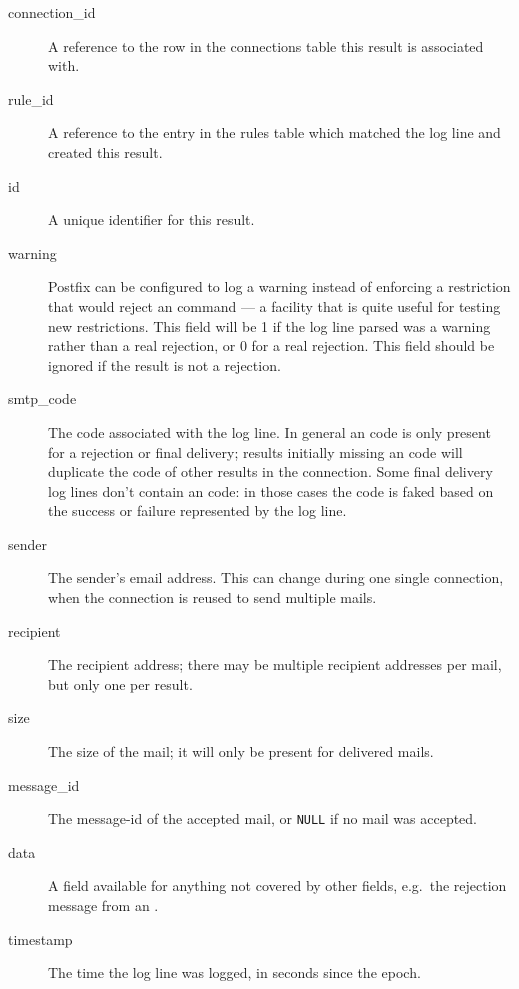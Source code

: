 \documentclass[a4paper,12pt,draft]{article}
\begin{document}
\begin{description}

    \item [connection\_id] A reference to the row in the connections table
        this result is associated with.

    \item [rule\_id] A reference to the entry in the rules table which
        matched the log line and created this result.

    \item [id] A unique identifier for this result.

    \item [warning] Postfix can be configured to log a warning instead of
        enforcing a restriction that would reject an \SMTP{} command --- a
        facility that is quite useful for testing new restrictions.  This
        field will be 1 if the log line parsed was a warning rather than a
        real rejection, or 0 for a real rejection.  This field should be
        ignored if the result is not a rejection.

    \item [smtp\_code] The \SMTP{} code associated with the log line.  In
        general an \SMTP{} code is only present for a rejection or final
        delivery; results initially missing an \SMTP{} code will duplicate
        the \SMTP{} code of other results in the connection.  Some final
        delivery log lines don't contain an \SMTP{} code: in those cases
        the code is faked based on the success or failure represented by
        the log line.

    \item [sender] The sender's email address.  This can change during one
        single connection, when the connection is reused to send multiple
        mails.

    \item [recipient] The recipient address; there may be multiple
        recipient addresses per mail, but only one per result.

    \item [size] The size of the mail; it will only be present for
        delivered mails.

    \item [message\_id] The message-id of the accepted mail, or
        \texttt{NULL} if no mail was accepted.

    \item [data] A field available for anything not covered by other
        fields, e.g.\ the rejection message from an \RBL{}\@.

    \item [timestamp] The time the log line was logged, in seconds since
        the epoch.

\end{description}
\end{document}
